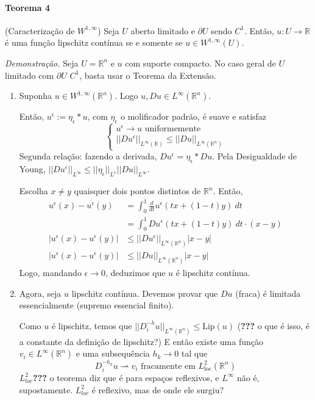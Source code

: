 \documentclass[a4paper, 11pt]{article}
\newcommand{\R}{\mathbb{R}}
\newcommand{\rn}{{\mathbb{R}^n}}
\newcommand{\pu}{\partial U}
\newcommand{\e}{\epsilon}
\begin{document}
\paragraph{Teorema 4}\label{t:sobolev-quociente-de-diferenças-infinito} (Caracterização de $W^{1,\infty}$) Seja $U$ aberto limitado e $\pu$ sendo $C^1$. Então, $u:U\rightarrow\R$ é uma função lipschitz contínua se e somente se $u \in W^{1,\infty}(U)$.

\textit{Demonstração.} Seja $U=\rn$ e $u$ com suporte compacto.
No caso geral de $U$ limitado com $\pu$ $C^1$, basta usar o Teorema da Extensão.

\begin{enumerate}
	\item Suponha $u \in W^{1,\infty}(\rn)$. Logo $u, Du \in L^\infty(\rn)$.

	Então, $u^\epsilon := \eta_\epsilon * u$, com $\eta_\e$ o molificador padrão, é suave e satisfaz \[\begin{cases}
		u^\e \rightarrow u \text{ uniformemente} \\
		||Du^\e||_{L^\infty(\R)} \leq ||Du||_{L^\infty(\rn)}
	\end{cases}\]
	Segunda relação: fazendo a derivada, $Du^\e = \eta_\epsilon * Du$. Pela Desigualdade de Young, $||Du^\e||_{L^\infty} \leq ||\eta_\e||_{L^1} ||Du||_{L^\infty}$.
	
	Escolha $x\neq y$ quaisquer dois pontos distintos de $\rn$. Então, \begin{align*}
		u^\e(x) - u^\e(y) &= \int_0^1 \frac{d}{dt}u^\e(tx + (1-t)y)\ dt \\
		&= \int_0^1 Du^\e(tx + (1-t)y)\ dt \cdot (x-y) \\
		|u^\e(x) - u^\e(y)| &\leq ||Du^\e||_{L^\infty(\rn)}|x-y| \\ 
		|u^\e(x) - u^\e(y)| &\leq ||Du||_{L^\infty(\rn)}|x-y|
	\end{align*}
	Logo, mandando $\e \rightarrow 0$, deduzimos que $u$ é lipschitz contínua.
	
	\item Agora, seja $u$ lipschitz contínua. Devemos provar que $Du$ (fraca) é limitada essencialmente (supremo essencial finito).

	Como $u$ é lipschitz, temos que $||D_i^{-h}u||_{L^\infty(\rn)}\leq \text{Lip}(u)$ (\textbf{???} o que é isso, é a constante da definição de lipschitz?) E então existe uma função $v_i \in L^\infty(\rn)$ e uma subsequência $h_k\rightarrow 0$ tal que \[ D_i^{-h_k}u \rightharpoonup v_i \text{ fracamente em } L^2_{\text{loc}}(\rn)\] \textbf{$L^2_{loc}$???} o teorema diz que é para espaços reflexivos, e $L^\infty$ não é, supostamente. $L^2_{loc}$ é reflexivo, mas de onde ele surgiu?


\end{enumerate}
\end{document}
